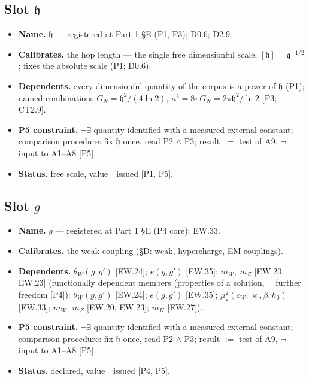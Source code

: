 \documentclass[11pt,openany]{report}
\theoremstyle{canonplain}
\theoremstyle{canondef}
\begin{document}
\subsection*{Slot $\mathfrak h$}
\begin{itemize}\setlength{\itemsep}{2pt}
\item \textbf{Name.} $\mathfrak h$ — registered at Part 1 §E (P1, P3); D0.6; D2.9.
\item \textbf{Calibrates.} the hop length — the single free dimensionful scale; $[\mathfrak h]=\mathfrak q^{-1/2}$; fixes the absolute scale (P1; D0.6).
\item \textbf{Dependents.} every dimensionful quantity of the corpus is a power of $\mathfrak h$ (P1); named combinations $G_N=\mathfrak h^2/(4\ln2)$, $\kappa^2=8\pi G_N=2\pi\mathfrak h^2/\ln2$ [P3; CT2.9].
\item \textbf{P5 constraint.} $\neg\exists$ quantity identified with a measured external constant; comparison procedure: fix $\mathfrak h$ once, read P2 $\wedge$ P3; result $:=$ test of A9, $\neg$ input to A1--A8 [P5].
\item \textbf{Status.} free scale, value $\neg$issued [P1, P5].
\end{itemize}
\subsection*{Slot $g$}
\begin{itemize}\setlength{\itemsep}{2pt}
\item \textbf{Name.} $g$ — registered at Part 1 §E (P4 core); EW.33.
\item \textbf{Calibrates.} the weak coupling (§D: weak, hypercharge, EM couplings).
\item \textbf{Dependents.} $\theta_W(g,g')$ [EW.24]; $e(g,g')$ [EW.35]; $m_W,\ m_Z$ [EW.20, EW.23] (functionally dependent members (properties of a solution, $\neg$ further freedom [P4]): $\theta_W(g,g')$ [EW.24]; $e(g,g')$ [EW.35]; $\mu_\star^2(c_W,\varkappa,\beta,h_0)$ [EW.33]; $m_W,\ m_Z$ [EW.20, EW.23]; $m_H$ [EW.27]).
\item \textbf{P5 constraint.} $\neg\exists$ quantity identified with a measured external constant; comparison procedure: fix $\mathfrak h$ once, read P2 $\wedge$ P3; result $:=$ test of A9, $\neg$ input to A1--A8 [P5].
\item \textbf{Status.} declared, value $\neg$issued [P4, P5].
\end{itemize}
\end{document}
